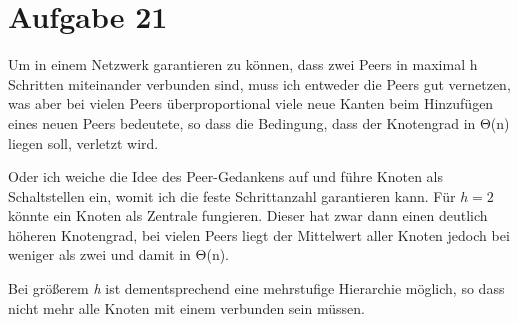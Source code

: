 \documentclass[10pt,a4paper]{article}
\begin{document}
\section*{Aufgabe 21}
Um in einem Netzwerk garantieren zu können, dass zwei Peers in maximal h Schritten miteinander verbunden sind, muss ich entweder die Peers gut vernetzen, was aber bei vielen Peers überproportional viele neue Kanten beim Hinzufügen eines neuen Peers bedeutete, so dass die Bedingung, dass der Knotengrad in Θ(n) liegen soll, verletzt wird.

Oder ich weiche die Idee des Peer-Gedankens auf und führe Knoten als Schaltstellen ein, womit ich die feste Schrittanzahl garantieren kann. Für $h=2$ könnte ein Knoten als Zentrale fungieren. Dieser hat zwar dann einen deutlich höheren Knotengrad, bei vielen Peers liegt der Mittelwert aller Knoten jedoch bei weniger als zwei und damit in Θ(n).

Bei größerem \textit{h} ist dementsprechend eine mehrstufige Hierarchie möglich, so dass nicht mehr alle Knoten mit einem verbunden sein müssen.
\end{document}
